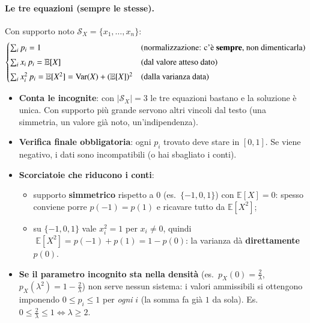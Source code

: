 \documentclass[12pt]{extarticle} %
\begin{document}
\paragraph{Le tre equazioni (sempre le stesse).} Con supporto noto $\mathcal{S}_X = \{x_1, \dots, x_n\}$:
$$ \begin{cases} \sum_i p_i = 1 & \text{(normalizzazione: c'è \textbf{sempre}, non dimenticarla)} \\[3pt] \sum_i x_i\, p_i = \mathbb{E}[X] & \text{(dal valore atteso dato)} \\[3pt] \sum_i x_i^2\, p_i = \mathbb{E}[X^2] = \mathrm{Var}(X) + (\mathbb{E}[X])^2 & \text{(dalla varianza data)} \end{cases} $$
\begin{itemize}
    \item \textbf{Conta le incognite}: con $|\mathcal{S}_X| = 3$ le tre equazioni bastano e la soluzione è unica. Con supporto più grande servono altri vincoli dal testo (una simmetria, un valore già noto, un'indipendenza).
    \item \textbf{Verifica finale obbligatoria}: ogni $p_i$ trovato deve stare in $[0,1]$. Se viene negativo, i dati sono incompatibili (o hai sbagliato i conti).
    \item \textbf{Scorciatoie che riducono i conti}:
    \begin{itemize}[-]
        \item supporto \textbf{simmetrico} rispetto a $0$ (es.\ $\{-1,0,1\}$) con $\mathbb{E}[X] = 0$: spesso conviene porre $p(-1) = p(1)$ e ricavare tutto da $\mathbb{E}[X^2]$;
        \item su $\{-1,0,1\}$ vale $x_i^2 = 1$ per $x_i \ne 0$, quindi $\;\mathbb{E}[X^2] = p(-1) + p(1) = 1 - p(0)$: la varianza dà \textbf{direttamente} $p(0)$.
    \end{itemize}
    \item \textbf{Se il parametro incognito sta nella densità} (es.\ $p_X(0) = \frac2\lambda$, $p_X(\lambda^2) = 1 - \frac2\lambda$) non serve nessun sistema: i valori ammissibili si ottengono imponendo $0 \le p_i \le 1$ per \emph{ogni} $i$ (la somma fa già $1$ da sola). {\footnotesize Es.\ $0 \le \frac2\lambda \le 1 \iff \lambda \ge 2$.}
\end{itemize}
\end{document}
